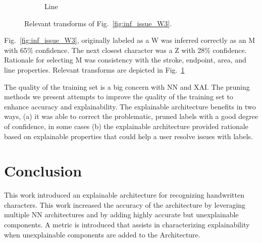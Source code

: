\documentclass[conference]{IEEEtran}
\begin{document}
\begin{figure}[h]
\begin{subfigure}{.20\columnwidth}
        \caption{Line}
    \end{subfigure}%
    \caption{Relevant transforms of Fig.~\ref{fig:inf_issue_W3}.}
    \label{fig:w3_trans}
\end{figure}

Fig.~\ref{fig:inf_issue_W3}, originally labeled as a W was inferred correctly as an M with 65\% confidence.
The next closest character was a Z with 28\% confidence.  Rationale for selecting M was consistency with the
stroke, endpoint, area, and line properties.  Relevant transforms are depicted in Fig.~\ref{fig:w3_trans}


The quality of the training set is a big concern with NN and XAI.  The pruning
methods we present attempts to improve the quality of the training set to
enhance accuracy and explainability. The explainable architecture benefits in
two ways, (a) it was able to correct the problematic, pruned labels with a good
degree of confidence, in some cases (b) the explainable architecture provided
rationale based on explainable properties that could help a user resolve issues
with labels.

\section{Conclusion}
\label{conclusion}






This work introduced an explainable architecture for recognizing handwritten
characters.  This work increased the accuracy of the architecture by leveraging
multiple NN architectures and by adding highly accurate but unexplainable
components. A metric is introduced that assists in characterizing explainability
when unexplainable components are added to the Architecture.
\end{document}
